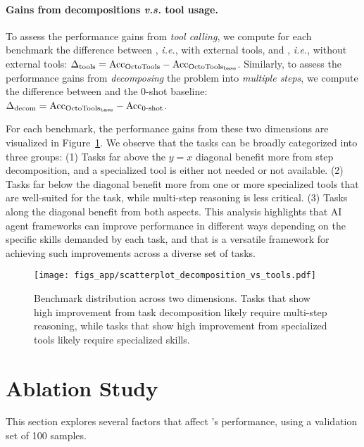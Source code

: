 \paragraph{Gains from decompositions \textit{v.s.} tool usage.}
To assess the performance gains from \textit{tool calling}, we compute for each benchmark the difference between \model, \textit{i.e.}, with external tools, and \modelbase, \textit{i.e.}, without external tools: $\Delta_{\text{tools}} = \text{Acc}_{\text{OctoTools}} - \text{Acc}_{\text{$\text{OctoTools}_\text{base}$}}$. Similarly, to assess the performance gains from \textit{decomposing} the problem into \textit{multiple steps}, we compute the difference between \modelbase and the 0-shot baseline: $\Delta_{\text{decom}} = \text{Acc}_{\text{$\text{OctoTools}_\text{base}$}} - \text{Acc}_{\text{0-shot}}$.

For each benchmark, the performance gains from these two dimensions are visualized in Figure~\ref{fig:scatterplot_decomposition_vs_tools}. We observe that the tasks can be broadly categorized into three groups: 
(1) Tasks far above the $y=x$ diagonal benefit more from step decomposition, and a specialized tool is either not needed or not available.
(2) Tasks far below the diagonal benefit more from one or more specialized tools that are well-suited for the task, while multi-step reasoning is less critical.
(3) Tasks along the diagonal benefit from both aspects.
This analysis highlights that AI agent frameworks can improve performance in different ways depending on the specific skills demanded by each task, and that \model is a versatile framework for achieving such improvements across a diverse set of tasks.

\begin{figure}[th!]
    \centering
    \texttt{[image: figs\_app/scatterplot\_decomposition\_vs\_tools.pdf]}
    \caption{Benchmark distribution across two dimensions. Tasks that show high improvement from task decomposition likely require multi-step reasoning, while tasks that show high improvement from specialized tools likely require specialized skills.}
    \label{fig:scatterplot_decomposition_vs_tools}
\end{figure}


\section{Ablation Study}
\label{sec:ablation_study}

This section explores several factors that affect \model's performance, using a validation set of 100 samples.


